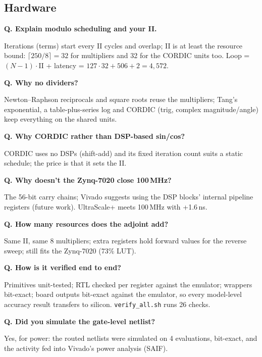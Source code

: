 \documentclass[11pt,a4paper]{article}
\newcounter{qn}
\newcommand{\qa}[2]{\stepcounter{qn}\par\medskip\noindent\textbf{Q\theqn. #1}\par\noindent #2\par}
\begin{document}
\subsection{Hardware}
\qa{Explain modulo scheduling and your II.}{Iterations (terms) start every II cycles and overlap; II is at least the resource bound: $\lceil250/8\rceil=32$ for multipliers and 32 for the CORDIC units too. Loop = $(N-1)\cdot$II + latency = $127\cdot32+506+2=4{,}572$.}
\qa{Why no dividers?}{Newton--Raphson reciprocals and square roots reuse the multipliers; Tang's exponential, a table-plus-series log and CORDIC (trig, complex magnitude/angle) keep everything on the shared units.}
\qa{Why CORDIC rather than DSP-based sin/cos?}{CORDIC uses no DSPs (shift-add) and its fixed iteration count suits a static schedule; the price is that it sets the II.}
\qa{Why doesn't the Zynq-7020 close 100\,MHz?}{The 56-bit carry chains; Vivado suggests using the DSP blocks' internal pipeline registers (future work). UltraScale+ meets 100\,MHz with +1.6\,ns.}
\qa{How many resources does the adjoint add?}{Same II, same 8 multipliers; extra registers hold forward values for the reverse sweep; still fits the Zynq-7020 (73\% LUT).}
\qa{How is it verified end to end?}{Primitives unit-tested; RTL checked per register against the emulator; wrappers bit-exact; board outputs bit-exact against the emulator, so every model-level accuracy result transfers to silicon. \texttt{verify\_all.sh} runs 26 checks.}
\qa{Did you simulate the gate-level netlist?}{Yes, for power: the routed netlists were simulated on 4 evaluations, bit-exact, and the activity fed into Vivado's power analysis (SAIF).}
\end{document}
